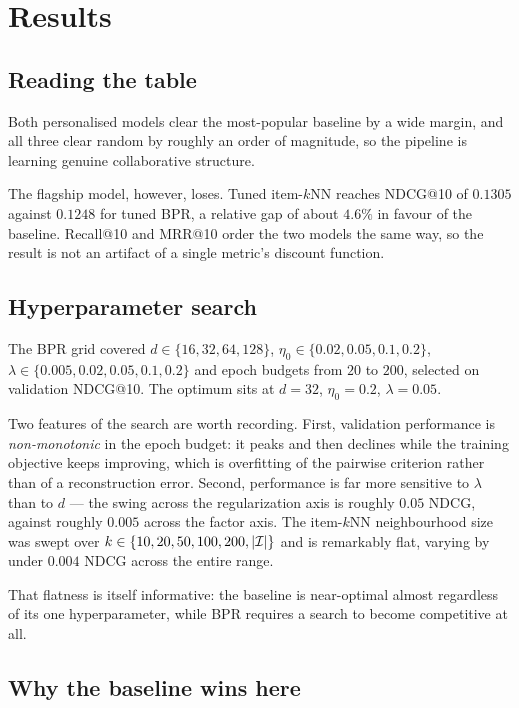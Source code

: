 \section{Results}
\label{sec:results}



\subsection{Reading the table}

Both personalised models clear the most-popular baseline by a wide margin,
and all three clear random by roughly an order of magnitude, so the pipeline
is learning genuine collaborative structure.

The flagship model, however, loses. Tuned item-$k$NN reaches NDCG@10 of
$0.1305$ against $0.1248$ for tuned BPR, a relative gap of about $4.6\%$ in
favour of the baseline. Recall@10 and MRR@10 order the two models the same
way, so the result is not an artifact of a single metric's discount function.

\subsection{Hyperparameter search}

The BPR grid covered $d \in \{16, 32, 64, 128\}$,
$\eta_0 \in \{0.02, 0.05, 0.1, 0.2\}$,
$\lambda \in \{0.005, 0.02, 0.05, 0.1, 0.2\}$ and epoch budgets from $20$ to
$200$, selected on validation NDCG@10. The optimum sits at $d = 32$,
$\eta_0 = 0.2$, $\lambda = 0.05$.

Two features of the search are worth recording. First, validation performance
is \emph{non-monotonic} in the epoch budget: it peaks and then declines while
the training objective keeps improving, which is overfitting of the pairwise
criterion rather than of a reconstruction error. Second, performance is far
more sensitive to $\lambda$ than to $d$ --- the swing across the
regularization axis is roughly $0.05$ NDCG, against roughly $0.005$ across
the factor axis. The item-$k$NN neighbourhood size was swept over
$k \in \{10, 20, 50, 100, 200, |\mathcal{I}|\}$ and is remarkably flat, varying by
under $0.004$ NDCG across the entire range.

That flatness is itself informative: the baseline is near-optimal almost
regardless of its one hyperparameter, while BPR requires a search to become
competitive at all.

\subsection{Why the baseline wins here}

